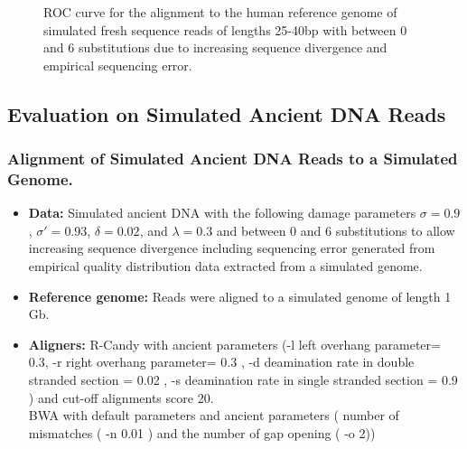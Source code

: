 \documentclass[11pt,a4paper]{report}
\begin{document}
\begin{itemize}
\begin{figure}[H]
\caption{
ROC curve for the alignment to the human reference genome of simulated fresh 
sequence reads of lengths 25-40bp with between 0 and 6 substitutions due 
to increasing sequence divergence and empirical sequencing error.
}


\label{DS6_emp}
\end{figure}
  \end{itemize}




\subsection{Evaluation on Simulated Ancient DNA Reads}

\subsubsection{Alignment of Simulated Ancient DNA Reads to a Simulated Genome.}
\label{ Alignment of Simulated Ancient DNA Reads to a Simulated Genome.}

\begin{itemize}
 
   
    \item \textbf{Data:} Simulated ancient DNA 
     with the following damage parameters $ \sigma = 0.9$, 
    $ \sigma\prime = 0.93 $, $\delta = 0.02 $,  and $\lambda = 0.3 $ and 
    between 0 and 6 substitutions to allow increasing sequence divergence
    including sequencing error generated from empirical quality distribution data
    extracted from a simulated genome.
  
 

  \item \textbf{Reference genome:}  Reads were aligned to a simulated genome of 
length 1 Gb.


  \item \textbf{Aligners:} R-Candy with ancient parameters 
  (-l left overhang parameter= 0.3, -r right overhang parameter= 0.3 , 
-d deamination rate in double stranded section = 0.02 , 
-s deamination rate in single stranded section = 0.9 )
  and cut-off alignments score 20. \\
  BWA with default parameters and ancient parameters \cite{green2010draft}
   ( number of mismatches ( -n 0.01 ) and the number of gap opening ( -o 2))

  \end{itemize}
\end{document}

